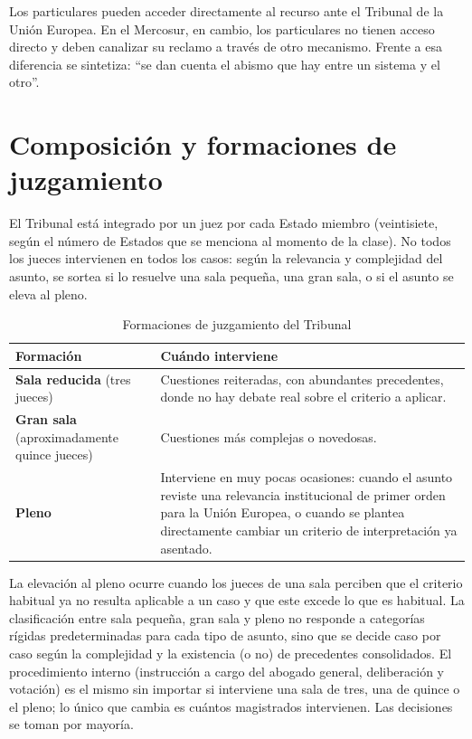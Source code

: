 \documentclass[12pt,oneside]{book}
\begin{document}
Los particulares pueden acceder directamente al recurso ante el Tribunal de la Unión Europea. En el Mercosur, en cambio, los particulares no tienen acceso directo y deben canalizar su reclamo a través de otro mecanismo. Frente a esa diferencia se sintetiza: “se dan cuenta el abismo que hay entre un sistema y el otro”.

\section{Composición y formaciones de juzgamiento}

El Tribunal está integrado por un juez por cada Estado miembro (veintisiete, según el número de Estados que se menciona al momento de la clase). No todos los jueces intervienen en todos los casos: según la relevancia y complejidad del asunto, se sortea si lo resuelve una sala pequeña, una gran sala, o si el asunto se eleva al pleno.

\begin{table}[H]
\centering
\caption{Formaciones de juzgamiento del Tribunal}
\renewcommand{\arraystretch}{1.25}
\begin{tabularx}{\textwidth}{
    >{\raggedright\arraybackslash}p{}
    >{\raggedright\arraybackslash}X
}
\toprule
\textbf{Formación} & \textbf{Cuándo interviene} \\
\midrule
\textbf{Sala reducida} (tres jueces) &
Cuestiones reiteradas, con abundantes precedentes, donde no hay debate real sobre el criterio a aplicar. \\
\addlinespace
\textbf{Gran sala} (aproximadamente quince jueces) &
Cuestiones más complejas o novedosas. \\
\addlinespace
\textbf{Pleno} &
Interviene en muy pocas ocasiones: cuando el asunto reviste una relevancia institucional de primer orden para la Unión Europea, o cuando se plantea directamente cambiar un criterio de interpretación ya asentado. \\
\bottomrule
\end{tabularx}
\end{table}

La elevación al pleno ocurre cuando los jueces de una sala perciben que el criterio habitual ya no resulta aplicable a un caso y que este excede lo que es habitual. La clasificación entre sala pequeña, gran sala y pleno no responde a categorías rígidas predeterminadas para cada tipo de asunto, sino que se decide caso por caso según la complejidad y la existencia (o no) de precedentes consolidados. El procedimiento interno (instrucción a cargo del abogado general, deliberación y votación) es el mismo sin importar si interviene una sala de tres, una de quince o el pleno; lo único que cambia es cuántos magistrados intervienen. Las decisiones se toman por mayoría.
\end{document}
